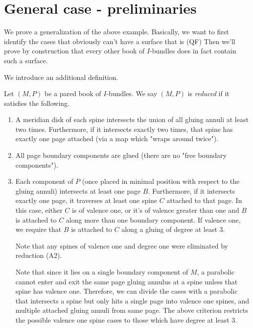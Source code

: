 \section{General case - preliminaries}

We prove a generalization of the above example. Basically, we want to first
identify the cases that obviously can't have a surface that is (QF) Then we'll
prove by construction that every other book of $I$-bundles does in fact contain
such a surface.

We introduce an additional definition.

\begin{defn}

Let $(M,P)$ be a pared book of $I$-bundles. We say $(M,P)$ is \emph{reduced} if
it satisfies the following.

\begin{enumerate}

\item A meridian disk of each spine intersects the union of all gluing annuli
at least two times. Furthermore, if it intersects exactly two times, that spine
has exactly one page attached (via a map which "wraps around twice").

\item All page boundary components are glued (there are no "free boundary
components").

\item Each component of $P$ (once placed in minimal position with respect to
the gluing annuli) intersects at least one page $B$. Furthermore, if it
intersects exactly one page, it traverses at least one spine $C$ attached to
that page. In this case, either $C$ is of valence one, or it's of valence
greater than one and $B$ is attached to $C$ along more than one boundary
component.  If valence one, we require that $B$ is attached to $C$ along
a gluing of degree at least 3.

Note that any spines of valence one and degree one were eliminated by reduction
(A2).

Note that since it lies on a single boundary component of $M$, a parabolic
cannot enter and exit the same page gluing annulus at a spine unless that spine
has valence one. Therefore, we can divide the cases with a parabolic that
intersects a spine but only hits a single page into valence one spines, and
multiple attached gluing annuli from same page. The above criterion restricts
the possible valence one spine cases to those which have degree at least 3.

\end{enumerate}

\end{defn}

